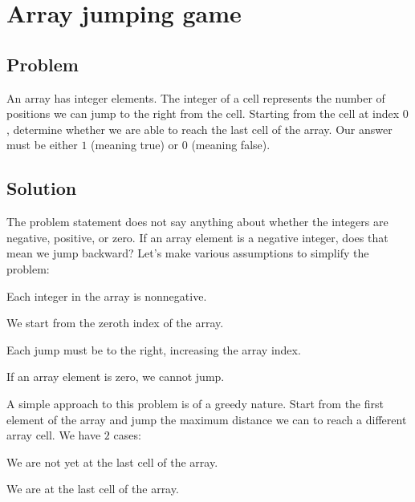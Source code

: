 
\section{Array jumping game}



\subsection*{Problem}

An array has integer elements.  The integer of a cell represents the
number of positions we can jump to the right from the cell.  Starting
from the cell at index $0$, determine whether we are able to reach the
last cell of the array.  Our answer must be either $1$ (meaning true)
or $0$ (meaning false).



\subsection*{Solution}

The problem statement does not say anything about whether the integers
are negative, positive, or zero.  If an array element is a negative
integer, does that mean we jump backward?  Let's make various
assumptions to simplify the problem:

\begin{packedenumeral}
\item Each integer in the array is nonnegative.
\item We start from the zeroth index of the array.
\item Each jump must be to the right, increasing the array index.
\item If an array element is zero, we cannot jump.
\end{packedenumeral}

A simple approach to this problem is of a greedy nature.  Start from
the first element of the array and jump the maximum distance we can to
reach a different array cell.  We have $2$ cases:

\begin{packedenumeral}
\item We are not yet at the last cell of the array.

\item We are at the last cell of the array.
\end{packedenumeral}

